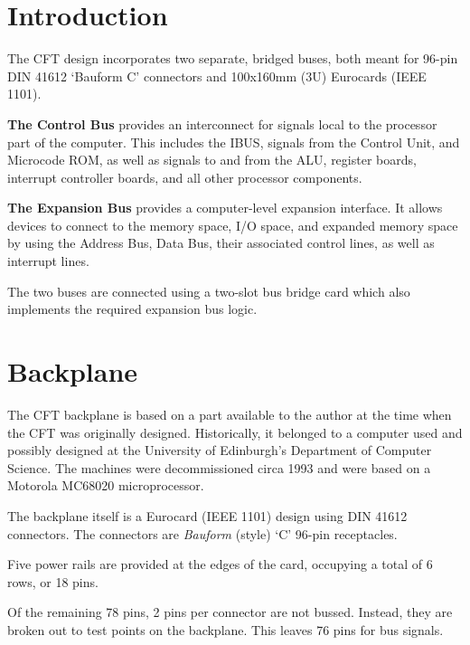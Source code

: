 \documentclass[11pt,a4paper,twocolumns]{article}
\newcommand\bus[1]{{#1}}
\newcommand\IBUS{\bus{IBUS}}
\begin{document}
\section{Introduction}

The CFT design incorporates two separate, bridged buses, both meant
for 96-pin DIN 41612 ‘Bauform C’ connectors and 100x160mm (3U)
Eurocards (IEEE 1101).

\begin{description}

\item{\bf The Control Bus} provides an interconnect for signals local
  to the processor part of the computer. This includes the
  \IBUS, signals from the Control Unit, and Microcode ROM, as well as
  signals to and from the ALU, register boards, interrupt controller
  boards, and all other processor components.

\item{\bf The Expansion Bus} provides a computer-level expansion
  interface. It allows devices to connect to the memory space, I/O
  space, and expanded memory space by using the Address Bus, Data Bus,
  their associated control lines, as well as interrupt lines.

\end{description}

The two buses are connected using a two-slot bus bridge card which
also implements the required expansion bus logic.

\section{Backplane}

The CFT backplane is based on a part available to the author at the
time when the CFT was originally designed. Historically, it belonged
to a computer used and possibly designed at the University of
Edinburgh's Department of Computer Science. The machines were
decommissioned circa 1993 and were based on a Motorola MC68020
microprocessor.

The backplane itself is a Eurocard (IEEE 1101) design using DIN 41612
connectors. The connectors are {\em Bauform\/} (style) ‘C’ 96-pin
receptacles.

Five power rails are provided at the edges of the card, occupying a
total of 6 rows, or 18 pins.

Of the remaining 78 pins, 2 pins per connector are not
bussed. Instead, they are broken out to test points on the
backplane. This leaves 76 pins for bus signals.
\end{document}

